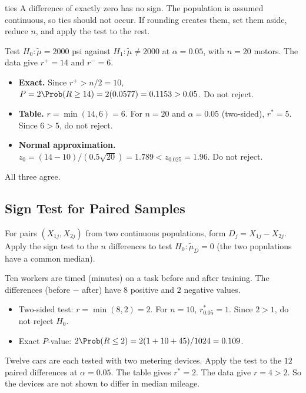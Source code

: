 \begin{pitfall}{ties}
A difference of exactly zero has no sign. The population is assumed continuous, so ties should not occur. If rounding creates them, set them aside, reduce $n$, and apply the test to the rest.
\end{pitfall}

\begin{example}
Test $H_0:\tilde\mu=2000$ psi against $H_1:\tilde\mu\ne2000$ at $\alpha=0.05$, with $n=20$ motors. The data give $r^+=14$ and $r^-=6$.
\begin{itemize}
  \item \textbf{Exact.} Since $r^+>n/2=10$, $P=2\Prob(R\ge14)=2(0.0577)=0.1153>0.05$. Do not reject.
  \item \textbf{Table.} $r=\min(14,6)=6$. For $n=20$ and $\alpha=0.05$ (two-sided), $r^*=5$. Since $6>5$, do not reject.
  \item \textbf{Normal approximation.} $z_0=(14-10)/(0.5\sqrt{20})=1.789<z_{0.025}=1.96$. Do not reject.
\end{itemize}
All three agree.
\end{example}

\subsection{Sign Test for Paired Samples}

For pairs $(X_{1j},X_{2j})$ from two continuous populations, form $D_j=X_{1j}-X_{2j}$. Apply the sign test to the $n$ differences to test $H_0:\tilde\mu_D=0$ (the two populations have a common median).

\begin{example}
Ten workers are timed (minutes) on a task before and after training. The differences (before $-$ after) have $8$ positive and $2$ negative values.
\begin{itemize}
  \item Two-sided test: $r=\min(8,2)=2$. For $n=10$, $r^*_{0.05}=1$. Since $2>1$, do not reject $H_0$.
  \item Exact $P$-value: $2\Prob(R\le2)=2(1+10+45)/1024=0.109$.
\end{itemize}
\end{example}

\begin{example}
Twelve cars are each tested with two metering devices. Apply the test to the $12$ paired differences at $\alpha=0.05$. The table gives $r^*=2$. The data give $r=4>2$. So the devices are not shown to differ in median mileage.
\end{example}

